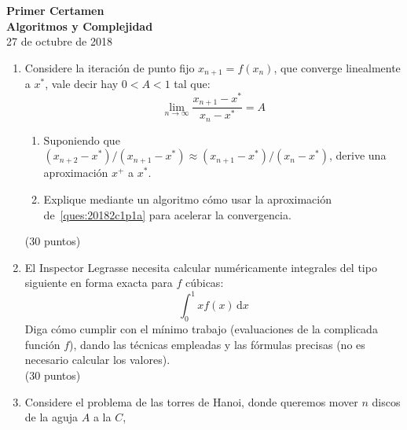 \documentclass[english, spanish, fleqn]{article}
\theoremstyle{plain}
\begin{document}
\pagestyle{empty}
  \begin{center}
    {\huge\textbf{Primer Certamen\\[0.25\baselineskip]
		  Algoritmos y Complejidad}}\\
    \vspace{0.5\baselineskip}
    {\large 27 de octubre de 2018}
  \end{center}
  \vspace{2mm}
  \begin{center}
  \end{center}
  \vspace{2.5mm}
  \begin{enumerate}
  \item %
    Considere la iteración de punto fijo
    \(x_{n + 1} = f(x_n)\),
    que converge linealmente a \(x^*\),
    vale decir hay \(0 < A < 1\) tal que:
    \begin{equation*}
      \lim_{n \to \infty} \frac{x_{n + 1} - x^*}{x_n - x^*}
	= A
    \end{equation*}
    \begin{enumerate}
    \item %
      \label{ques:20182c1p1a}
      Suponiendo que
      \((x_{n + 2} - x^*) / (x_{n + 1} - x^*)
	  \approx (x_{n + 1} - x^*) / (x_n - x^*)\),
      derive una aproximación \(x^+\) a \(x^*\).
    \item %
      Explique mediante un algoritmo
      cómo usar la aproximación de~\ref{ques:20182c1p1a}
      para acelerar la convergencia.
    \end{enumerate}
    \hspace*{\fill}(30 puntos)
  \item %
    El Inspector Legrasse
    necesita calcular numéricamente integrales del tipo siguiente
    en forma exacta para \(f\) cúbicas:
    \begin{equation*}
      \int_0^1 x f(x) \, \mathrm{d} x
    \end{equation*}
    Diga cómo cumplir con el mínimo trabajo
    (evaluaciones de la complicada función \(f\)),
    dando las técnicas empleadas y las fórmulas precisas
    (no es necesario calcular los valores).
    \\ \hspace*{\fill}(30 puntos)
  \item %
    Considere el problema de las torres de Hanoi,
    donde queremos mover \(n\) discos de la aguja \(A\) a la \(C\),

\end{enumerate}
\end{document}
